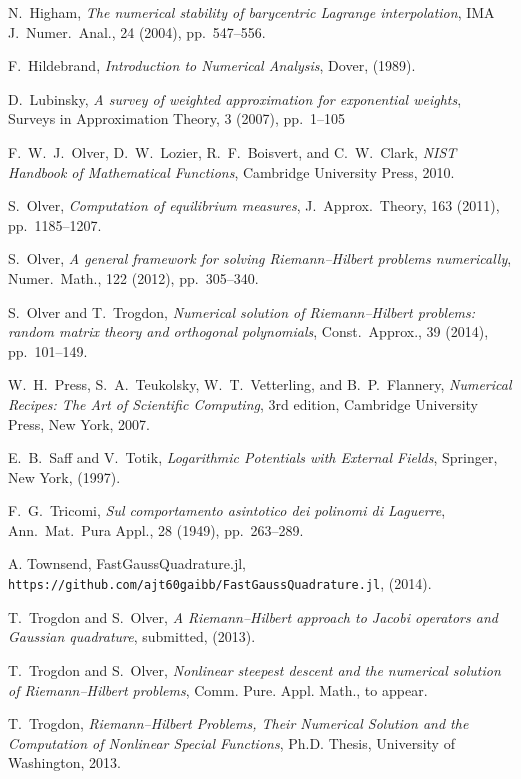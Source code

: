 \documentclass[final]{siamltex}
\begin{document}
\begin{thebibliography}{3}
 {\sc N.\ Higham}, {\em The numerical stability of barycentric Lagrange interpolation}, {IMA J.\ Numer.\ Anal.}, 24 (2004), pp.~547--556.

 {\sc F.\ Hildebrand}, {\em Introduction to Numerical Analysis}, {Dover}, (1989).

 {\sc D.\ Lubinsky}, {\em A survey of weighted approximation for exponential weights}, {Surveys in Approximation Theory}, 3 (2007), pp.~1--105

 {\sc F.\ W.\ J.\ Olver, D.\ W.\ Lozier, R.\ F.\ Boisvert, and C.\ W.\ Clark}, {\em NIST Handbook of Mathematical Functions}, {Cambridge University Press}, 2010.

 {\sc S.\ Olver}, {\em Computation of equilibrium measures}, {J.\ Approx.\ Theory}, 163 (2011), pp.~1185--1207.

 {\sc S.\ Olver}, {\em A general framework for solving Riemann--Hilbert problems numerically}, {Numer.\ Math.}, 122 (2012), pp.~305--340.

 {\sc S.\ Olver and T.\ Trogdon}, {\em Numerical solution of Riemann--Hilbert problems: random matrix theory and orthogonal polynomials}, {Const.\ Approx.}, 39 (2014), pp.~101--149.

 {\sc W.\ H.\ Press, S.\ A.\ Teukolsky, W.\ T.\ Vetterling, and B.\ P.\ Flannery}, {\em Numerical Recipes: The Art of Scientific Computing}, {3rd edition}, {Cambridge University Press, New York}, 2007.

 {\sc E.\ B.\ Saff and V.\ Totik}, {\em Logarithmic Potentials with External Fields}, {Springer, New York}, (1997).

 {\sc F.\ G.\ Tricomi}, {\em Sul comportamento asintotico dei polinomi di Laguerre}, {Ann.\ Mat.\ Pura Appl.}, 28 (1949), pp.~263--289.

 {\sc A. Townsend}, FastGaussQuadrature.jl, {\tt https://github.com/ajt60gaibb/FastGaussQuadrature.jl}, (2014).

 {\sc T.\ Trogdon and S.\ Olver}, {\em A Riemann--Hilbert approach to Jacobi operators and Gaussian quadrature}, {submitted}, (2013).

 {\sc T.\ Trogdon and S.\ Olver}, {\em Nonlinear steepest descent and the numerical solution of Riemann--Hilbert problems}, {Comm. Pure. Appl. Math.}, to appear.

 {\sc T.\ Trogdon}, {\em Riemann--Hilbert Problems, Their Numerical Solution and the Computation of Nonlinear Special Functions}, Ph.D. Thesis, University of Washington, 2013.

\end{thebibliography}
\end{document}
